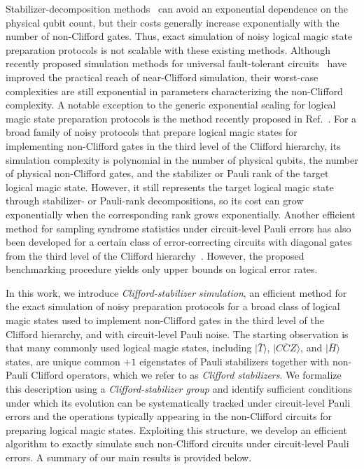 \documentclass[
 reprint,
 amsmath,amssymb,
 pra,superscriptaddress, nofootinbib
]{revtex4-2}
\theoremstyle{definition}
\theoremstyle{plain}
\begin{document}
Stabilizer-decomposition
methods~\cite{PhysRevLett.116.250501,PhysRevX.6.021043,Bravyi2019simulationofquantum,kissinger2022simulating,aziz2026classicalsimulationslowmagic,kuyanov2026efficientclassicalsimulationlowrankwidth} can avoid an exponential dependence on the physical qubit count, but their costs generally increase exponentially with the number of non-Clifford gates.
Thus, exact simulation of noisy logical magic state preparation protocols is not scalable with these existing methods.
Although recently proposed simulation methods for universal fault-tolerant circuits~\cite{li2025softhighperformancesimulatoruniversal,haenel2026tsimfastuniversalsimulator,chase2026clifftfastexactsimulation,fang2026symftuniversalfaulttolerantquantum,wan2025cuttingstabiliserdecompositionsmagic} have improved the practical reach of near-Clifford simulation, their worst-case complexities are still exponential in parameters characterizing the non-Clifford complexity. 
A notable exception to the generic exponential scaling for logical magic state preparation protocols is the method recently proposed in Ref.~\cite{fby6-xjbm}. For a broad family of noisy protocols that prepare logical magic states for implementing non-Clifford gates in the third level of the Clifford hierarchy, its simulation complexity is polynomial in the number of physical qubits, the number of physical non-Clifford gates, and the stabilizer or Pauli rank of the target logical magic state. However, it still represents the target logical magic state through stabilizer- or Pauli-rank decompositions, so its cost can grow exponentially when the corresponding rank grows exponentially. 
Another efficient method for sampling syndrome statistics under circuit-level Pauli errors has also been developed for a certain class of error-correcting circuits with diagonal gates from the third level of the Clifford hierarchy~\cite{delafuente2026highthresholddecodingnonpaulicodes}. However, the proposed benchmarking procedure yields only upper bounds on logical error rates.

In this work, we introduce \textit{Clifford-stabilizer simulation}, an efficient method for the exact simulation of noisy preparation protocols for a broad class of logical magic states used to implement non-Clifford gates in the third level of the Clifford hierarchy, and with circuit-level Pauli noise.
The starting observation is that many commonly used logical magic states, including $|\bar{T}\rangle$, $|\overline{CCZ}\rangle$, and $|\bar{H}\rangle$ states, are unique common $+1$ eigenstates of Pauli stabilizers together with non-Pauli Clifford operators, which we refer to as \emph{Clifford stabilizers}. We formalize this description using a \textit{Clifford-stabilizer group} and identify sufficient conditions under which its evolution can be systematically tracked under circuit-level Pauli errors and the operations typically appearing in the non-Clifford circuits for preparing logical magic states.
Exploiting this structure, we develop an efficient algorithm to exactly simulate such non-Clifford circuits under circuit-level Pauli errors.
A summary of our main results is provided below.
\end{document}
